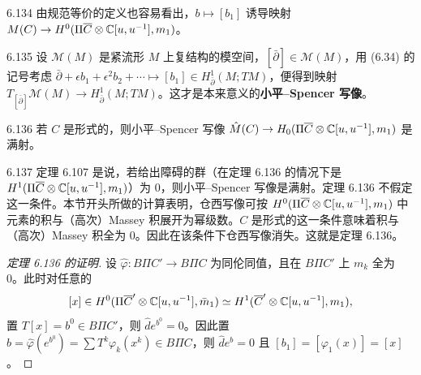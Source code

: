 \begin{remark}{6.134}
  由规范等价的定义也容易看出，$b\mapsto[b_1]$ 诱导映射 $M(C)\to H^0(\Pi\overline C\otimes\mathbb{C}[u,u^{-1}],m_1)$。
\end{remark}

\begin{remark}{6.135}
  设 $\mathcal{M}(M)$ 是紧流形 $M$ 上复结构的模空间，$[\bar\partial]\in\mathcal{M}(M)$，用 (6.34) 的记号考虑 $\bar\partial+\epsilon b_1+\epsilon^2b_2+\cdots\mapsto[b_1]\in H^{1}_{\bar\partial}(M;TM)$，便得到映射 $T_{[\bar\partial]}\mathcal{M}(M)\to H^{1}_{\bar\partial}(M;TM)$。这才是本来意义的\textbf{小平–Spencer 写像}。
\end{remark}

\begin{theorem}{6.136}
  若 $C$ 是形式的，则小平–Spencer 写像 $\hat M(C)\to H_0(\Pi\overline C\otimes\mathbb{C}[u,u^{-1}],m_1)$ 是满射。
\end{theorem}

\begin{remark}{6.137}
  定理 6.107 是说，若给出障碍的群（在定理 6.136 的情况下是 $H^1(\Pi\overline C\otimes\mathbb{C}[u,u^{-1}],m_1)$）为 0，则小平–Spencer 写像是满射。定理 6.136 不假定这一条件。本节开头所做的计算表明，仓西写像可按 $H^0(\Pi\overline C\otimes\mathbb{C}[u,u^{-1}],m_1)$ 中元素的积与（高次）Massey 积展开为幂级数。$C$ 是形式的这一条件意味着积与（高次）Massey 积全为 0。因此在该条件下仓西写像消失。这就是定理 6.136。
\end{remark}

\begin{proof}[定理 6.136 的证明]
  设 $\hat\varphi\colon B\Pi C'\to B\Pi C$ 为同伦同值，且在 $B\Pi C'$ 上 $m_k$ 全为 0。此时对任意的
  \[
    [x]\in H^0(\Pi\overline C'\otimes\mathbb{C}[u,u^{-1}],\bar m_1)\simeq H^1(\overline C'\otimes\mathbb{C}[u,u^{-1}],m_1),
  \]
  置 $T[x]=b^0\in B\Pi C'$，则 $\hat de^{b^0}=0$。因此置 $b=\hat\varphi(e^{b^0})=\sum T^k\varphi_k(x^k)\in B\Pi C$，则 $\hat de^b=0$ 且 $[b_1]=[\varphi_1(x)]=[x]$。
\end{proof}



